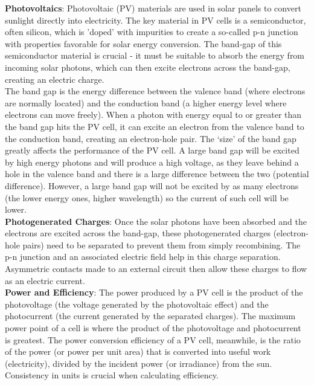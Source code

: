 \textbf{Photovoltaics}: Photovoltaic (\gls{PV}) materials are used in solar panels to convert 
sunlight directly into electricity. The key material in PV cells is a semiconductor, 
often silicon, which is 'doped' with impurities to create a so-called p-n junction 
with properties favorable for solar energy conversion. The band-gap of this 
semiconductor material is crucial - it must be suitable to absorb the energy from 
incoming solar photons, which can then excite electrons across the band-gap, 
creating an electric charge.\\

\noindent The band gap is the energy difference between the valence band (where electrons 
are normally located) and the conduction band (a higher energy level where 
electrons can move freely). When a photon with energy equal to or greater than 
the band gap hits the PV cell, it can excite an electron from the valence band 
to the conduction band, creating an electron-hole pair. The `size' of the band gap
greatly affects the performance of the PV cell. A large band gap will be excited by
high energy photons and will produce a high voltage, as they leave behind a hole
in the valence band and there is a large difference between the two (potential 
difference). However, a large band gap will not be excited by as many electrons
(the lower energy ones, higher wavelength) so the current of such cell will be lower.\\

\textbf{Photogenerated Charges}: Once the solar photons have been absorbed and the 
electrons are excited across the band-gap, these photogenerated charges 
(electron-hole pairs) need to be separated to prevent them from simply recombining. 
The p-n junction and an associated electric field help in this charge separation. 
Asymmetric contacts made to an external circuit then allow these charges to flow 
as an electric current.\\

\textbf{Power and Efficiency}: The power produced by a PV cell is the product of the 
photovoltage (the voltage generated by the photovoltaic effect) and the 
photocurrent (the current generated by the separated charges). The maximum power 
point of a cell is where the product of the photovoltage and photocurrent is 
greatest. The power conversion efficiency of a PV cell, meanwhile, is the ratio 
of the power (or power per unit area) that is converted into useful work 
(electricity), divided by the incident power (or irradiance) from the sun. 
Consistency in units is crucial when calculating efficiency.\\

